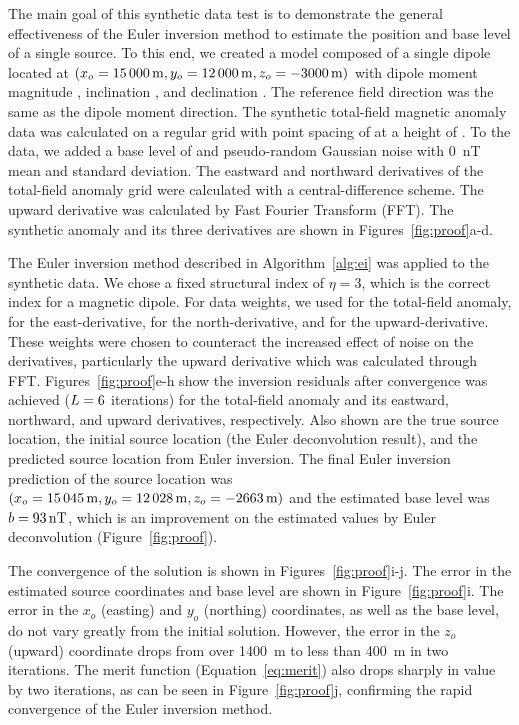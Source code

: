 The main goal of this synthetic data test is to demonstrate the general effectiveness of the Euler inversion method to estimate the position and base level of a single source.
To this end, we created a model composed of a single dipole located at 
$(x_o = \SynProofTrueEast, y_o = \SynProofTrueNorth, z_o = \SynProofTrueUp)$
with dipole moment magnitude \SynProofInt{}, inclination \SynProofInc{}, and declination \SynProofDec{}.
The reference field direction was the same as the dipole moment direction.
The synthetic total-field magnetic anomaly data was calculated on a regular grid
with point spacing of \SynProofSpacing{} at a height of \SynProofHeight{}.
To the data, we added a base level of \SynProofTrueBase{} and 
pseudo-random Gaussian noise with \qty{0}{\nano\tesla} mean and \SynProofNoise{} standard deviation.
The eastward and northward derivatives of the total-field anomaly grid were calculated with a central-difference scheme.
The upward derivative was calculated by Fast Fourier Transform (FFT).
The synthetic anomaly and its three derivatives are shown in Figures~\ref{fig:proof}a-d.

The Euler inversion method described in Algorithm~\ref{alg:ei} was applied to the synthetic data.
We chose a fixed structural index of $\eta=3$, which is the correct index for a magnetic dipole.
For data weights, we used \DefaultWeightsF{} for the total-field anomaly, \DefaultWeightsE{} for the east-derivative, \DefaultWeightsN{} for the north-derivative, and \DefaultWeightsU{} for the upward-derivative.
These weights were chosen to counteract the increased effect of noise on the derivatives, particularly the upward derivative which was calculated through FFT.
Figures~\ref{fig:proof}e-h show the inversion residuals after convergence was achieved ($L=6{}$ iterations) for the total-field anomaly and its eastward, northward, and upward derivatives, respectively. 
Also shown are the true source location, the initial source location (the Euler deconvolution result), and the predicted source location from Euler inversion.
The final Euler inversion prediction of the source location was $(x_o=\SynProofEstEast, y_o=\SynProofEstNorth, z_o=\SynProofEstUp)$ and the estimated base level was $b = \qty{93}{\nano\tesla}$, which is an improvement on the estimated values by Euler deconvolution (Figure~\ref{fig:proof}).

The convergence of the solution is shown in Figures~\ref{fig:proof}i-j. 
The error in the estimated source coordinates and base level are shown in Figure~\ref{fig:proof}i.
The error in the $x_o$ (easting) and $y_o$ (northing) coordinates, as well as the base level, do not vary greatly from the initial solution.
However, the error in the $z_o$ (upward) coordinate drops from over \qty{1400}{\m} to less than \qty{400}{\m} in two iterations.
The merit function (Equation~\ref{eq:merit}) also drops sharply in value by two iterations, as can be seen in Figure~\ref{fig:proof}j, confirming the rapid convergence of the Euler inversion method.


